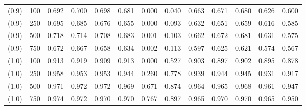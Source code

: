 \begin{table}[ht]
{\begin{tabular}{ll|ccccccccccc}
(0.9) & 100 & 0.692 & 0.700 & 0.698 & 0.681 & 0.000 & 0.040 & 0.663 & 0.671 & 0.680 & 0.626 & 0.600 \\
(0.9) & 250 & 0.695 & 0.685 & 0.676 & 0.655 & 0.000 & 0.093 & 0.632 & 0.651 & 0.659 & 0.616 & 0.585 \\
(0.9) & 500 & 0.718 & 0.714 & 0.708 & 0.683 & 0.001 & 0.103 & 0.662 & 0.672 & 0.681 & 0.631 & 0.575 \\
(0.9) & 750 & 0.672 & 0.667 & 0.658 & 0.634 & 0.002 & 0.113 & 0.597 & 0.625 & 0.621 & 0.574 & 0.567 \\
(1.0) & 100 & 0.913 & 0.919 & 0.909 & 0.913 & 0.000 & 0.527 & 0.903 & 0.897 & 0.902 & 0.895 & 0.878 \\
(1.0) & 250 & 0.958 & 0.953 & 0.953 & 0.944 & 0.260 & 0.778 & 0.939 & 0.944 & 0.945 & 0.931 & 0.917 \\
(1.0) & 500 & 0.971 & 0.972 & 0.972 & 0.969 & 0.671 & 0.874 & 0.964 & 0.965 & 0.968 & 0.961 & 0.947 \\
(1.0) & 750 & 0.974 & 0.972 & 0.970 & 0.970 & 0.767 & 0.897 & 0.965 & 0.970 & 0.970 & 0.965 & 0.950 \\
\hline
\end{tabular}

    }
    \end{table}
    


   
  
